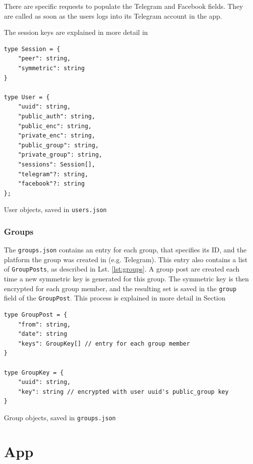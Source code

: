 \documentclass[a4paper, oneside]{discothesis}
\begin{document}
There are specific requests to populate the Telegram and Facebook fields. They are called as soon as the users logs into its Telegram account in the app.

The session keys are explained in more detail in 


\begin{listing}[h!]
\label{lst:users}
\begin{verbatim}
type Session = {
    "peer": string,
    "symmetric": string
}

type User = {
    "uuid": string,
    "public_auth": string,
    "public_enc": string,
    "private_enc": string,
    "public_group": string,
    "private_group": string,
    "sessions": Session[],
    "telegram"?: string,
    "facebook"?: string
};
\end{verbatim}
\caption{User objects, saved in \texttt{users.json}}
\end{listing}

\subsubsection{Groups}
\label{sec:group_keys}

The \texttt{groups.json} contains an entry for each group, that specifies its ID, and the platform the group was created in (e.g. Telegram). This entry also contains a list of \texttt{GroupPosts}, as described in Lst. \ref{lst:groups}. A group post are created each time a new symmetric key is generated for this group. The symmetric key is then encrypted for each group member, and the resulting set is saved in the \texttt{group} field of the \texttt{GroupPost}. This process is explained in more detail in Section 

\begin{listing}[h!]
\begin{verbatim}
type GroupPost = {
    "from": string,
    "date": string
    "keys": GroupKey[] // entry for each group member
}

type GroupKey = {
    "uuid": string,
    "key": string // encrypted with user uuid's public_group key
}
\end{verbatim}
\caption{Group objects, saved in \texttt{groups.json}}
\label{lst:groups}
\end{listing}

\section{App}
\end{document}
